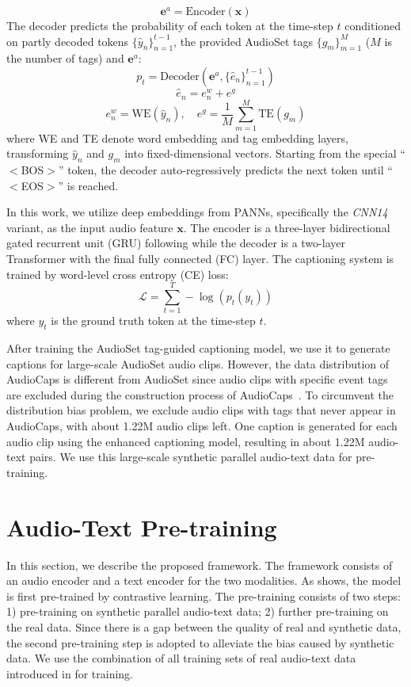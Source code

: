 \documentclass[sigconf]{acmart}
\begin{document}
$$
    \mathbf{e}^{a} = \text{Encoder}(\mathbf{x})
$$
The decoder predicts the probability of each token at the time-step $t$ conditioned on partly decoded tokens $\{\hat{y}_n\}_{n=1}^{t-1}$, the provided AudioSet tags $\{{g}_m\}_{m=1}^{M}$ ($M$ is the number of tags) and $\mathbf{e}^{a}$:
$$
    p_t = \text{Decoder}(\mathbf{e}^{a}, \{\hat{e}_n\}_{n=1}^{t-1})
$$
$$
    \hat{e}_n = {e}_{n}^{w} + {e}^{g}
$$
$$
    {e}_{n}^{w}=\text{WE}(\hat{y}_n),
    \quad {e}^{g} = \frac{1}{M} \sum_{m=1}^{M}{\text{TE}(g_m)}
$$
where WE and TE denote word embedding and tag embedding layers, transforming $\hat{y}_n$ and ${g}_m$ into fixed-dimensional vectors.
Starting from the special ``$<$BOS$>$'' token, the decoder auto-regressively predicts the next token until ``$<$EOS$>$'' is reached.

In this work, we utilize deep embeddings from PANNs, specifically the \textit{CNN14} variant, as the input audio feature $\mathbf{x}$.
The encoder is a three-layer bidirectional gated recurrent unit (GRU) following \cite{eren2020semantic} while the decoder is a two-layer Transformer with the final fully connected (FC) layer.
The captioning system is trained by word-level cross entropy (CE) loss:
$$
    \mathcal{L} = \sum_{t=1}^T-\log\left(p_t(y_t)\right)
$$
where $y_t$ is the ground truth token at the time-step $t$.

After training the AudioSet tag-guided captioning model, we use it to generate captions for large-scale AudioSet audio clips.
However, the data distribution of AudioCaps is different from AudioSet since audio clips with specific event tags are excluded during the construction process of AudioCaps~\cite{kim2019audiocaps}.
To circumvent the distribution bias problem, we exclude audio clips with tags that never appear in AudioCaps, with about 1.22M audio clips left.
One caption is generated for each audio clip using the enhanced captioning model, resulting in about 1.22M audio-text pairs.
We use this large-scale synthetic parallel audio-text data for pre-training.

\section{Audio-Text Pre-training}
In this section, we describe the proposed framework.
The framework consists of an audio encoder and a text encoder for the two modalities.
As  shows, the model is first pre-trained by contrastive learning.
The pre-training consists of two steps: 1) pre-training on synthetic parallel audio-text data; 2) further pre-training on the real data.
Since there is a gap between the quality of real and synthetic data, the second pre-training step is adopted to alleviate the bias caused by synthetic data.
We use the combination of all training sets of real audio-text data introduced in  for training.
\end{document}
